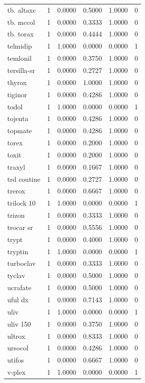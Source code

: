 \begin{longtable}{p{3.0cm}rrrrr}
tb. altaxc & 1 & 0.0000 & 0.5000 & 1.0000 & 0 \\
tb. mccol & 1 & 0.0000 & 0.3333 & 1.0000 & 0 \\
tb. torax & 1 & 0.0000 & 0.4444 & 1.0000 & 0 \\
telmidip & 1 & 1.0000 & 0.0000 & 0.0000 & 1 \\
temlonil & 1 & 0.0000 & 0.3750 & 1.0000 & 0 \\
tersilla-sr & 1 & 0.0000 & 0.2727 & 1.0000 & 0 \\
thyrox & 1 & 0.0000 & 1.0000 & 1.0000 & 0 \\
tiginor & 1 & 0.0000 & 0.4286 & 1.0000 & 0 \\
todol & 1 & 1.0000 & 0.0000 & 0.0000 & 1 \\
tojenta & 1 & 0.0000 & 0.4286 & 1.0000 & 0 \\
topmate & 1 & 0.0000 & 0.4286 & 1.0000 & 0 \\
torex & 1 & 0.0000 & 0.2000 & 1.0000 & 0 \\
toxit & 1 & 0.0000 & 0.2000 & 1.0000 & 0 \\
traxyl & 1 & 0.0000 & 0.1667 & 1.0000 & 0 \\
trd coutine & 1 & 0.0000 & 0.2727 & 1.0000 & 0 \\
trerox & 1 & 0.0000 & 0.6667 & 1.0000 & 0 \\
trilock 10 & 1 & 1.0000 & 0.0000 & 0.0000 & 1 \\
trizon & 1 & 0.0000 & 0.3333 & 1.0000 & 0 \\
trocar sr & 1 & 0.0000 & 0.5556 & 1.0000 & 0 \\
trypt & 1 & 0.0000 & 0.4000 & 1.0000 & 0 \\
tryptin & 1 & 1.0000 & 0.0000 & 0.0000 & 1 \\
turboclav & 1 & 0.0000 & 0.3333 & 1.0000 & 0 \\
tyclav & 1 & 0.0000 & 0.5000 & 1.0000 & 0 \\
ucrafate & 1 & 0.0000 & 0.5000 & 1.0000 & 0 \\
uful dx & 1 & 0.0000 & 0.7143 & 1.0000 & 0 \\
uliv & 1 & 1.0000 & 0.0000 & 0.0000 & 1 \\
uliv 150 & 1 & 0.0000 & 0.3750 & 1.0000 & 0 \\
ultrox & 1 & 0.0000 & 0.8333 & 1.0000 & 0 \\
ursocol & 1 & 0.0000 & 0.4286 & 1.0000 & 0 \\
utifos & 1 & 0.0000 & 0.6667 & 1.0000 & 0 \\
v-plex & 1 & 1.0000 & 0.0000 & 0.0000 & 1 \\

\end{longtable}
